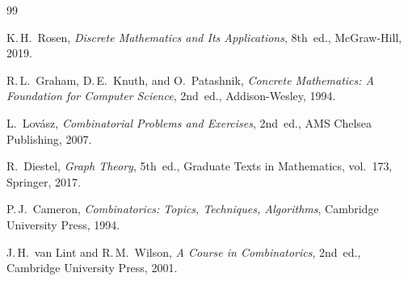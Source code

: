 \documentclass[12pt,a4paper,openany]{book}
\theoremstyle{definition}
\theoremstyle{plain}
\theoremstyle{remark}
\begin{document}
\begin{thebibliography}{99}

K.\,H.\ Rosen,
\emph{Discrete Mathematics and Its Applications},
8th~ed., McGraw-Hill, 2019.

R.\,L.\ Graham, D.\,E.\ Knuth, and O.\ Patashnik,
\emph{Concrete Mathematics: A Foundation for Computer Science},
2nd~ed., Addison-Wesley, 1994.

L.\ Lov\'asz,
\emph{Combinatorial Problems and Exercises},
2nd~ed., AMS Chelsea Publishing, 2007.

R.\ Diestel,
\emph{Graph Theory},
5th~ed., Graduate Texts in Mathematics, vol.~173,
Springer, 2017.

P.\,J.\ Cameron,
\emph{Combinatorics: Topics, Techniques, Algorithms},
Cambridge University Press, 1994.

J.\,H.\ van Lint and R.\,M.\ Wilson,
\emph{A Course in Combinatorics},
2nd~ed., Cambridge University Press, 2001.

\end{thebibliography}

\printindex
\end{document}
